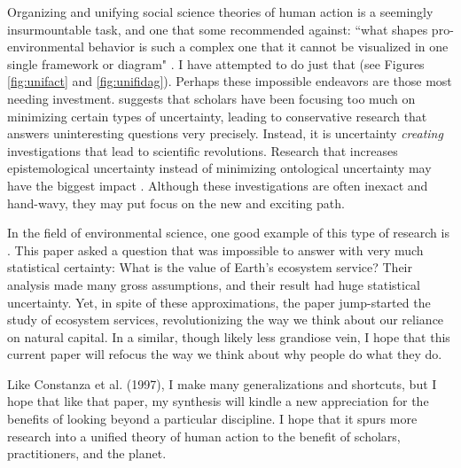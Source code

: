 \documentclass[12 pt]{article}
\begin{document}
 
Organizing and unifying social science theories of human action is a seemingly insurmountable task, and one that some recommended against: ``what shapes pro-environmental behavior is such a complex one that it cannot be visualized in one single framework or diagram" \parencite[][p. 248]{Kollmuss2002}. I have attempted to do just that (see Figures \ref{fig:unifact} and \ref{fig:unifidag}). 
Perhaps these impossible endeavors are those most needing investment. \textcite{Haslam2001} suggests that scholars have been focusing too much on minimizing certain types of uncertainty, leading to conservative research that answers uninteresting questions very precisely. Instead, it is uncertainty \textit{creating} investigations that lead to scientific revolutions. Research that increases epistemological uncertainty instead of minimizing ontological uncertainty may have the biggest impact \parencite{Haslam2001}. Although these investigations are often inexact and hand-wavy, they may put focus on the new and exciting path. 

In the field of environmental science, one good example of this type of research is \textcite{Costanza1997}. This paper asked a question that was impossible to answer with very much statistical certainty: What is the value of Earth's ecosystem service? Their analysis made many gross assumptions, and their result had huge statistical uncertainty. Yet, in spite of these approximations, the paper jump-started the study of ecosystem services, revolutionizing the way we think about our reliance on natural capital.  In a similar, though likely less grandiose vein, I hope that this current paper will refocus the way we think about why people do what they do. 

Like Constanza et al. (1997), I make many generalizations and shortcuts, but I hope that like that paper, my synthesis will kindle a new appreciation for the benefits of looking beyond a particular discipline. I hope that it spurs more research into a unified theory of human action to the benefit of scholars, practitioners, and the planet. 
\bigskip
\bigskip
\bigskip

\printbibliography
\end{document}
